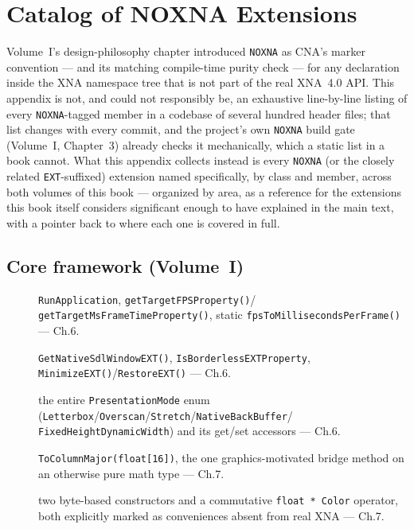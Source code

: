 \chapter{Catalog of NOXNA Extensions}
\label{ch:noxna-catalog}

Volume~I's design-philosophy chapter introduced \texttt{NOXNA} as CNA's marker convention ---
and its matching compile-time purity check --- for any declaration inside the XNA namespace
tree that is not part of the real XNA~4.0 API. This appendix is not, and could not
responsibly be, an exhaustive line-by-line listing of every \texttt{NOXNA}-tagged member in a
codebase of several hundred header files; that list changes with every commit, and the
project's own \texttt{NOXNA} build gate (Volume~I, Chapter~3) already checks it mechanically,
which a static list in a book cannot. What this appendix collects instead is every
\texttt{NOXNA} (or the closely related \texttt{EXT}-suffixed) extension named specifically,
by class and member, across both volumes of this book --- organized by area, as a reference
for the extensions this book itself considers significant enough to have explained in the
main text, with a pointer back to where each one is covered in full.

\section{Core framework (Volume~I)}

\begin{description}
\item[] \texttt{RunApplication}, \texttt{getTargetFPSProperty()}/%
  \texttt{getTargetMsFrameTimeProperty()}, static \texttt{fpsToMillisecondsPerFrame()} --- Ch.6.
\item[] \texttt{GetNativeSdlWindowEXT()}, \texttt{IsBorderlessEXTProperty},
  \texttt{MinimizeEXT()}/\texttt{RestoreEXT()} --- Ch.6.
\item[] the entire \texttt{PresentationMode} enum
  (\texttt{Letterbox}/\texttt{Overscan}/\texttt{Stretch}/\texttt{NativeBackBuffer}/%
  \texttt{FixedHeightDynamicWidth}) and its get/set accessors --- Ch.6.
\item[] \texttt{ToColumnMajor(float[16])}, the one graphics-motivated bridge
  method on an otherwise pure math type --- Ch.7.
\item[] two byte-based constructors and a commutative \texttt{float * Color}
  operator, both explicitly marked as conveniences absent from real XNA --- Ch.7.
\end{description}

